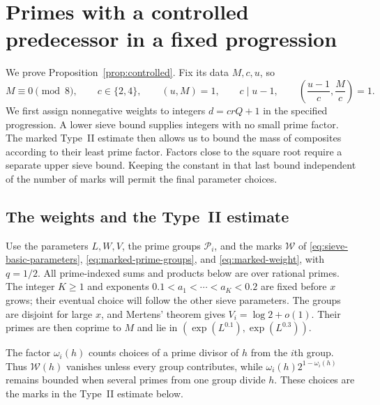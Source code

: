 \section{Primes with a controlled predecessor in a fixed progression}
\label{sec:prime-construction}
\label{sec:construction}

We prove Proposition~\ref{prop:controlled}.  Fix its data \(M,c,u\), so
\begin{equation}\label{con:progression}
 M\equiv0\pmod8,\qquad c\in\{2,4\},\qquad
 (u,M)=1,\qquad c\mid u-1,\qquad
 \left(\frac{u-1}{c},\frac Mc\right)=1.
\end{equation}
We first assign nonnegative weights to integers \(d=crQ+1\) in the
specified progression.  A lower sieve bound supplies integers with
no small prime factor.  The marked Type~II estimate then allows us
to bound the mass of composites according to their least prime
factor.  Factors close to the square root require a separate upper
sieve bound.  Keeping the constant in that last bound independent
of the number of marks will permit the final parameter choices.

\subsection{The weights and the Type~II estimate}

Use the parameters $L,W,V$, the prime groups $\mathcal P_i$, and
the marks $\mathcal W$ of
\eqref{eq:sieve-basic-parameters}, \eqref{eq:marked-prime-groups},
and \eqref{eq:marked-weight}, with $q=1/2$.
All prime-indexed sums and products below are over rational primes.
The integer $K\ge1$ and exponents
$0.1<a_1<\cdots<a_K<0.2$ are fixed before $x$ grows; their eventual
choice will follow the other sieve parameters.
The groups are disjoint for large \(x\), and Mertens' theorem gives
\(V_i=\log2+o(1)\).  Their primes are then coprime to \(M\) and lie
in \((\exp(L^{0.1}),\exp(L^{0.3}))\).

The factor \(\omega_i(h)\) counts choices of a prime divisor of
\(h\) from the \(i\)th group. Thus \(\mathcal W(h)\) vanishes
unless every group contributes, while
\(\omega_i(h)2^{1-\omega_i(h)}\) remains bounded when several
primes from one group divide \(h\). These choices are the marks
in the Type~II estimate below.

